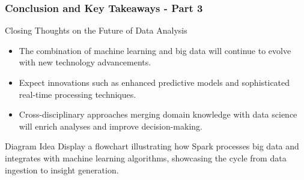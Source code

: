 \documentclass[aspectratio=169]{beamer}
\begin{document}
\begin{frame}[fragile]
    \frametitle{Conclusion and Key Takeaways - Part 3}
    \begin{block}{Closing Thoughts on the Future of Data Analysis}
        \begin{itemize}
            \item The combination of machine learning and big data will continue to evolve with new technology advancements.
            \item Expect innovations such as enhanced predictive models and sophisticated real-time processing techniques.
            \item Cross-disciplinary approaches merging domain knowledge with data science will enrich analyses and improve decision-making.
        \end{itemize}
    \end{block}

    \begin{block}{Diagram Idea}
        Display a flowchart illustrating how Spark processes big data and integrates with machine learning algorithms, showcasing the cycle from data ingestion to insight generation.
    \end{block}
\end{frame}
\end{document}
